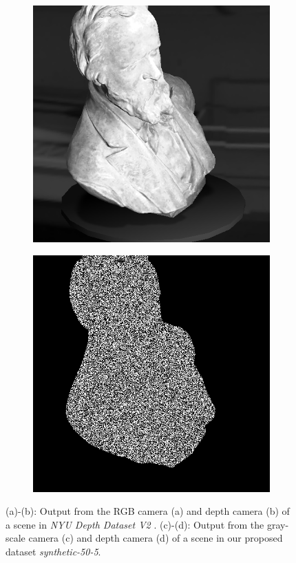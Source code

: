 \begin{figure}[h!]
\begin{subfigure}[b]{0.24\linewidth}
	\caption{}
\end{subfigure}
	\begin{subfigure}[b]{0.24\linewidth}
	\includegraphics[width=\linewidth]{./Figures/train-image.png}
	\caption{}
\end{subfigure}
	\begin{subfigure}[b]{0.24\linewidth}
	\includegraphics[width=\linewidth]{./Figures/train-depth-noise.png}
	\caption{}
\end{subfigure}
	\decoRule
	\caption{(a)-(b): Output from the RGB camera (a) and depth camera (b) of a scene in \textit{NYU Depth Dataset V2} \cite{nyu}. (c)-(d): Output from the gray-scale camera (c) and depth camera (d) of a scene in our proposed dataset \textit{synthetic-50-5}.}
	\label{fig:dataset-comparison}
\end{figure}

